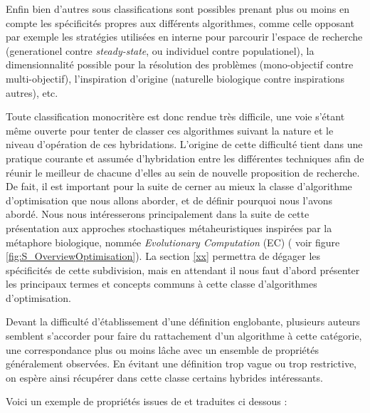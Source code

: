 Enfin bien d'autres sous classifications sont possibles prenant plus ou moins en compte les spécificités propres aux différents algorithmes, comme celle opposant par exemple les stratégies utilisées en interne pour parcourir l'espace de recherche (generationel contre \textit{steady-state}, ou individuel contre populationel), la dimensionnalité possible pour la résolution des problèmes (mono-objectif contre multi-objectif), l'inspiration d'origine (naturelle biologique contre inspirations autres), etc. 

Toute classification monocritère est donc rendue très difficile, une voie s'étant même ouverte pour tenter de classer ces algorithmes suivant la nature et le niveau d'opération de ces hybridations. L'origine de cette difficulté tient dans une pratique courante et assumée d'hybridation entre les différentes techniques afin de réunir le meilleur de chacune d'elles au sein de nouvelle proposition de recherche. De fait, il est important pour la suite de cerner au mieux la classe d'algorithme d'optimisation que nous allons aborder, et de définir pourquoi nous l'avons abordé. Nous nous intéresserons principalement dans la suite de cette présentation aux approches stochastiques métaheuristiques inspirées par la métaphore biologique, nommée \textit{Evolutionary Computation} (EC) ( voir figure \ref{fig:S_OverviewOptimisation}). La section \ref{xx} permettra de dégager les spécificités de cette subdivision, mais en attendant il nous faut d'abord présenter les principaux termes et concepts communs à cette classe d'algorithmes d'optimisation. 

Devant la difficulté d'établissement d'une définition englobante, plusieurs auteurs semblent s'accorder pour faire du rattachement d'un algorithme à cette catégorie, une correspondance plus ou moins lâche avec un ensemble de propriétés généralement observées. En évitant une définition trop vague ou trop restrictive, on espère ainsi récupérer dans cette classe certains hybrides intéressants. 

Voici un exemple de propriétés issues de \textcite{Blum2003} et traduites ci dessous :

